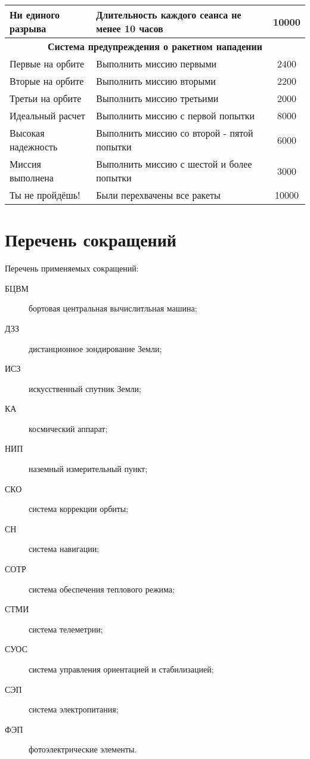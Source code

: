 \documentclass[12pt,a4paper]{article}
\begin{document}
\begin{center}
\begin{longtable}{ |p{5cm}|p{8cm}|c|}
  \hline
  Ни единого разрыва & Длительность каждого сеанса не менее 10 часов & 10000\\
  \hline
  \multicolumn{3}{|c|}{\textbf{Система предупреждения о ракетном нападении}}\\
  \hline
  Первые на орбите & Выполнить миссию первыми & 2400\\
  \hline
  Вторые на орбите & Выполнить миссию вторыми & 2200\\
  \hline
  Третьи на орбите & Выполнить миссию третьими & 2000\\
  \hline
  Идеальный расчет & Выполнить миссию с первой попытки & 8000\\
  \hline
  Высокая надежность & Выполнить миссию со второй - пятой попытки & 6000\\
  \hline
  Миссия выполнена & Выполнить миссию с шестой и более попытки & 3000\\
  \hline
  Ты не пройдёшь! & Были перехвачены все ракеты & 10000\\
  \hline
\end{longtable}
\end{center}

\section*{Перечень сокращений}

Перечень применяемых сокращений:

\begin{description}
\item[БЦВМ] бортовая центральная вычислитльная машина;
\item[ДЗЗ] дистанционное зондирование Земли;
\item[ИСЗ] искусственный спутник Земли;
\item[КА] космический аппарат;
\item[НИП] наземный измерительный пункт;
\item[СКО] система коррекции орбиты;
\item[СН] система навигации;
\item[СОТР] система обеспечения теплового режима;
\item[СТМИ] система телеметрии;
\item[СУОС] система управления ориентацией и стабилизацией;
\item[СЭП] система электропитания;
\item[ФЭП] фотоэлектрические элементы.
\end{description}
\end{document}
